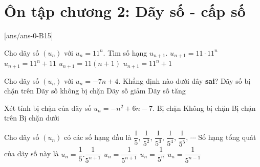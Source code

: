 \section{Ôn tập chương 2: Dãy số - cấp số}
[ans/ans-0-B15]
\caulc
 \begin{ex}%
 	Cho dãy số $\left(u_n\right)$ với $u_n=11^n.$ Tìm số hạng $u_{n+1}$.
 	\choice
 	{\True $u_{n+1}=11\cdot11^n$}
 	{$u_{n+1}=11^n+11$}
 	{$u_{n+1}=11\left(n+1\right)$}
 	{$u_{n+1}=11^n+1$}
 \end{ex}


\begin{ex}%
	Cho dãy số $\left(u_n\right)$ với $u_n=-7n+4$. Khẳng định nào dưới đây \textbf{sai}?
	\choice
	{Dãy số bị chặn trên}
	{Dãy số không bị chặn}
	{Dãy số giảm}
	{\True Dãy số tăng}
\end{ex}


\begin{ex}%
	Xét tính bị chặn của dãy số $u_n=-n^2+6n-7$.
	\choice
	{Bị chặn}
	{Không bị chặn}
	{\True Bị chặn trên}
	{Bị chặn dưới}
\end{ex}

\begin{ex}%
	Cho dãy số $\left(u_n\right)$ có các số hạng đầu là $\dfrac{1}{5}$, $\dfrac{1}{5^2}$, $\dfrac{1}{5^3}$, $\dfrac{1}{5^4}$, $\dfrac{1}{5^5}$, $\cdots $ Số hạng tổng quát của dãy số này là
	\choice
	{$u_n=\dfrac{1}{5}.\dfrac{1}{5^{n+1}}$}
	{$u_n=\dfrac{1}{5^{n+1}}$}
	{\True $u_n=\dfrac{1}{5^n}$}
	{$u_n=\dfrac{1}{5^{n-1}}$}
\end{ex}

